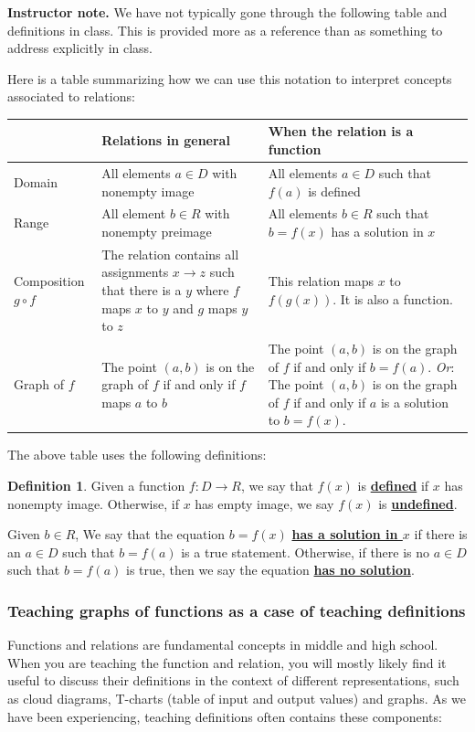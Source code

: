 \documentclass[11pt]{article}
\newcommand\smallnote[1]
	{\begin{mdframed}\raggedright  {\bf Instructor note.} {#1} \end{mdframed}}
\renewcommand\emph[1]{\underline{\bf{#1}}} %
\theoremstyle{definition}
\newtheorem{definition}[theorem]{Definition}
\begin{document}
\smallnote{
We have not typically gone through the following table and definitions in class. This is provided more as a reference than as something to address explicitly in class. 
}

Here is a table summarizing how we can use this notation to interpret concepts associated to relations:

\begin{tabular}{L{1in}L{2.5in}|L{2.5in}}
	& Relations in general & When the relation is a function \\ \hline
Domain &  All elements $a\in D$ with nonempty image 
	& All elements $a\in D$ such that $f(a)$ is defined \\
Range & All element $b \in R$ with nonempty preimage
	 & All elements $b\in R$ such that $b=f(x)$ has a solution in $x$ \\
Composition $g\circ f$ & The relation contains all assignments $x\to z$ such that there is a $y$ where $f$ maps $x$ to $y$ and $g$ maps $y$ to $z$  
	& This relation maps $x$ to $f(g(x))$. It is also a function. \\ 
Graph of $f$ & The point $(a,b)$ is on the graph of $f$ if and only if $f$ maps $a$ to $b$
	& The point $(a,b)$ is on the graph of $f$ if and only if $b=f(a)$. 
	{\it Or}: The point $(a,b)$ is on the graph of $f$ if and only if $a$ is a solution to $b=f(x)$. \\
\end{tabular}

The above table uses the following definitions:

\begin{definition}
Given a function $f:D\to R$, we say that $f(x)$ is \emph{defined} if $x$ has nonempty image. Otherwise, if $x$ has empty image, we say $f(x)$ is \emph{undefined}.

Given $b\in R$, We say that the equation $b=f(x)$ \emph{has a solution in $x$} if there is an $a\in D$ such that $b=f(a)$ is a true statement. Otherwise, if there is no $a\in D$ such that $b=f(a)$ is true, then we say the equation \emph{has no solution}.
\end{definition}


\vspace*{-12pt}
\subsubsection{Teaching graphs of functions as a case of teaching definitions}
\label{s: teaching definitions}

Functions and relations are fundamental concepts in middle and high school. When you are teaching the function and relation, you will mostly likely find it useful to discuss their definitions in the context of different representations, such as cloud diagrams, T-charts (table of input and output values) and graphs.  As we have been experiencing, teaching definitions often contains these components:
\end{document}
